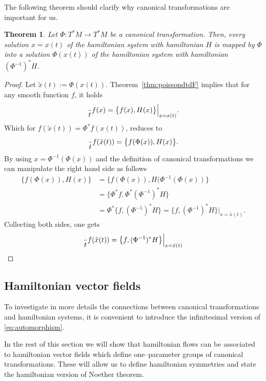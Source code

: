 \documentclass[english,fontsize=11pt,paper=a5,oneside]{scrbook}
\let\d\relax
\DeclareMathOperator{\d}{d}
\newtheorem{theorem}{Theorem}[chapter]
\theoremstyle{definition}
\begin{document}
The following theorem should clarify why canonical transformations are important for us.
\begin{theorem}\label{thm:canonicalmapping}
    Let $\Phi: T^*M \to T^* M$ be a canonical transformation.
    Then, every solution $x = x(t)$ of the hamiltonian system with hamiltonian $H$ is mapped by $\Phi$ into a solution $\Phi(x(t))$ of the hamiltonian system with hamiltonian $(\Phi^{-1})^* H$.
\end{theorem}
\begin{proof}
    Let $\tilde x(t) := \Phi(x(t))$. Theorem~\ref{thm:poissondtdF} implies that for any smooth function $f$, it holds
    \begin{equation}
        \frac{\d}{\d t} f(x) = \big\{f(x), H(x)\big\}\Big|_{x=x(t)}.
    \end{equation}
    Which for $f(\tilde x(t)) = \Phi^* f(x(t))$, reduces to
    \begin{equation}
        \frac{\d}{\d t} f(\tilde x(t)) = \big\{f(\Phi(x)), H(x)\big\}.
    \end{equation}
    By using $x = \Phi^{-1}(\Phi(x))$ and the definition of canonical transformations we can manipulate the right hand side as follows
    \begin{align}
        \big\{f(\Phi(x)), H(x)\big\} &= \big\{f(\Phi(x)), H(\Phi^{-1}(\Phi(x))\big\} \\
        &= \big\{\Phi^* f, \Phi^* (\Phi^{-1})^* H\big\} \\
        &= \Phi^* \big\{f, (\Phi^{-1})^* H\big\} = \big\{f, (\Phi^{-1})^* H\big\}\Big|_{x=\tilde x(t)}.
    \end{align}
    Collecting both sides, one gets
    \begin{equation}
        \frac{\d}{\d t} f(\tilde x(t)) = \big\{f, (\Phi^{-1})^* H\big\}\Big|_{x=\tilde x(t)}
    \end{equation}
\end{proof}

\subsection{Hamiltonian vector fields}

To investigate in more details the connections between canonical transformations and hamiltonian systems, it is convenient to introduce the infinitesimal version of \eqref{eq:automorphism}.

In the rest of this section we will show that hamiltonian flows can be associated to hamiltonian vector fields which define one--parameter groups of canonical transformations. These will allow us to define hamiltonian symmetries and state the hamiltonian version of Noether theorem.
\end{document}
